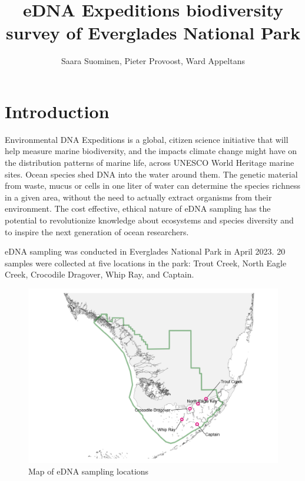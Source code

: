 \documentclass[10pt]{article}
\title{eDNA Expeditions biodiversity survey of Everglades National Park}
\author{Saara Suominen, Pieter Provoost, Ward Appeltans}
\begin{document}
\maketitle

\section{Introduction}

\begin{multicols}{2}
Environmental DNA Expeditions is a global, citizen science initiative that will help measure marine biodiversity, and the impacts climate change might have on the distribution patterns of marine life, across UNESCO World Heritage marine sites.
Ocean species shed DNA into the water around them. The genetic material from waste, mucus or cells in one liter of water can determine the species richness in a given area, without the need to actually extract organisms from their environment.
The cost effective, ethical nature of eDNA sampling has the potential to revolutionize knowledge about ecosystems and species diversity and to inspire the next generation of ocean researchers.

eDNA sampling was conducted in Everglades National Park in April 2023. 20 samples were collected at five locations in the park: Trout Creek, North Eagle Creek, Crocodile Dragover, Whip Ray, and Captain.

\end{multicols}

\begin{figure}[h]
\centering
\includegraphics[width=\textwidth]{map}
\caption{Map of eDNA sampling locations}
\end{figure}
\end{document}
